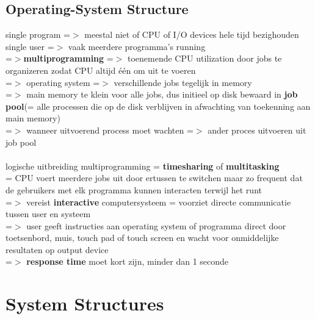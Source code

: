 \documentclass{report}
\begin{document}
\section{Operating-System Structure}
single program =$>$ meestal niet of CPU of I/O devices hele tijd bezighouden
\\single user =$>$ vaak meerdere programma's running
\\=$>$\textbf{multiprogramming} =$>$ toenemende CPU utilization door jobs te organizeren zodat CPU altijd \'e\'en om uit te voeren
\\=$>$ operating system =$>$ verschillende jobs tegelijk in memory
\\=$>$ main memory te klein voor alle jobs, dus initieel op disk bewaard in \textbf{job pool}(= alle processen die op de disk verblijven in afwachting van toekenning aan main memory)
\\=$>$ wanneer uitvoerend process moet wachten =$>$ ander proces uitvoeren uit job pool
\\
\\logische uitbreiding multiprogramming = \textbf{timesharing} of \textbf{multitasking}
\\= CPU voert meerdere jobs uit door ertussen te switchen maar zo frequent dat de gebruikers met elk programma kunnen interacten terwijl het runt
\\=$>$ vereist \textbf{interactive} computersysteem = voorziet directe communicatie tussen user en systeem
\\=$>$ user geeft instructies aan operating system of programma direct door toetsenbord, muis, touch pad of touch screen en wacht voor onmiddelijke resultaten op output device
\\=$>$ \textbf{response time} moet kort zijn, minder dan 1 seconde

\chapter{System Structures}
\end{document}
